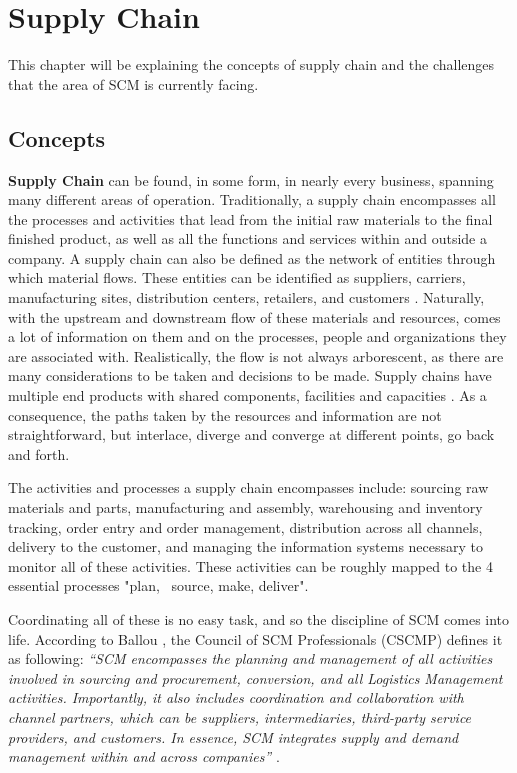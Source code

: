 \chapter{Supply Chain}
\label{chap:supply-chain-problems}


This chapter will be explaining the concepts of supply chain and the challenges that the area of SCM is currently facing.

\section{Concepts}
\textbf{Supply Chain} can be found, in some form, in nearly every business, spanning many different areas of operation. Traditionally, a supply chain encompasses all the processes and activities that lead from the initial raw materials to the final finished product, as well as all the functions and services within and outside a company. A supply chain can also be defined as the network of entities through which material flows. These entities can be identified as suppliers, carriers, manufacturing sites, distribution centers, retailers, and customers \cite{Lummus2014}. Naturally, with the upstream and downstream flow of these materials and resources, comes a lot of information on them and on the processes, people and organizations they are associated with. Realistically, the  flow is not always arborescent, as there are many considerations to be taken and decisions to be made. Supply chains have multiple end products with shared components, facilities and capacities \cite{Ganeshan1995}. As a consequence, the paths taken by the resources and information are not straightforward, but interlace, diverge and converge at different points, go back and forth.
  
  The activities and processes a supply chain encompasses include: sourcing raw materials and parts, manufacturing and assembly, warehousing and inventory tracking, order entry and order management, distribution across all channels, delivery to the customer, and managing the information systems necessary to monitor all of these activities. These activities can be roughly mapped to the 4 essential processes "plan,~ source, make, deliver". \cite{Lummus2014}
  
  Coordinating all of these is no easy task, and so the discipline of SCM comes into life. According to Ballou \cite{Ballou2007}, the Council of SCM Professionals (CSCMP) defines it as following: \textit{“SCM encompasses the planning and management of all activities involved in sourcing and procurement, conversion, and all Logistics Management activities. Importantly, it also includes coordination and collaboration with channel partners, which can be suppliers, intermediaries, third-party service providers, and customers. In essence, SCM integrates supply and demand management within and across companies”} .

